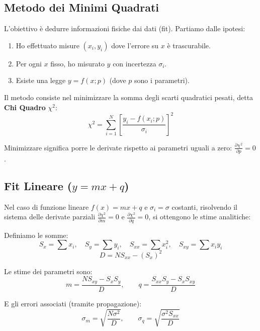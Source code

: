 \documentclass[openany,a4paper,12pt]{book}
\theoremstyle{remark}
\begin{document}
\subsection{Metodo dei Minimi Quadrati}

L'obiettivo è dedurre informazioni fisiche dai dati (fit). Partiamo dalle ipotesi:
\begin{enumerate}
    \item Ho effettuato misure $(x_i, y_i)$ dove l'errore su $x$ è trascurabile.
    \item Per ogni $x$ fisso, ho misurato $y$ con incertezza $\sigma_i$.
    \item Esiste una legge $y = f(x; p)$ (dove $p$ sono i parametri).
\end{enumerate}

Il metodo consiste nel minimizzare la somma degli scarti quadratici pesati, detta \textbf{Chi Quadro} $\chi^2$:
\begin{equation}
    \chi^2 = \sum_{i=1}^{N} \left[ \frac{y_i - f(x_i; p)}{\sigma_i} \right]^2
\end{equation}

Minimizzare significa porre le derivate rispetto ai parametri uguali a zero: $\frac{\partial \chi^2}{\partial p} = 0$.




\subsection*{Fit Lineare ($y = mx + q$)}
Nel caso di funzione lineare $f(x) = mx + q$ e $\sigma_i = \sigma$ costanti, risolvendo il sistema delle derivate parziali $\frac{\partial \chi^2}{\partial m} = 0$ e $\frac{\partial \chi^2}{\partial q} = 0$, si ottengono le stime analitiche:

Definiamo le somme:
\[ S_x = \sum x_i, \quad S_y = \sum y_i, \quad S_{xx} = \sum x_i^2, \quad S_{xy} = \sum x_i y_i \]
\[ D = N S_{xx} - (S_x)^2 \]

Le stime dei parametri sono:
\begin{equation}
    m = \frac{N S_{xy} - S_x S_y}{D}, \qquad q = \frac{S_{xx} S_y - S_x S_{xy}}{D}
\end{equation}

E gli errori associati (tramite propagazione):
\begin{equation}
    \sigma_m = \sqrt{\frac{N \sigma^2}{D}}, \qquad \sigma_q = \sqrt{\frac{\sigma^2 S_{xx}}{D}}
\end{equation}
\end{document}
